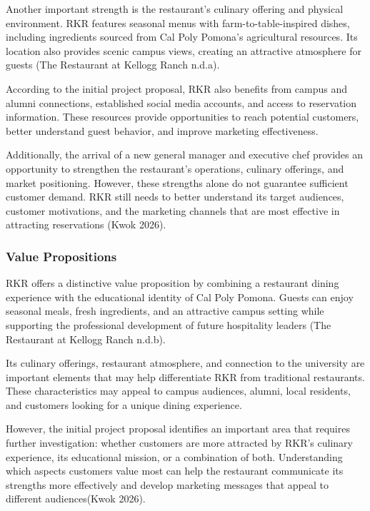 \documentclass[
  12pt,
  letterpaper,
  DIV=11,
  numbers=noendperiod]{scrartcl}
\begin{document}
Another important strength is the restaurant's culinary offering and
physical environment. RKR features seasonal menus with
farm-to-table-inspired dishes, including ingredients sourced from Cal
Poly Pomona's agricultural resources. Its location also provides scenic
campus views, creating an attractive atmosphere for guests (The
Restaurant at Kellogg Ranch n.d.a).

According to the initial project proposal, RKR also benefits from campus
and alumni connections, established social media accounts, and access to
reservation information. These resources provide opportunities to reach
potential customers, better understand guest behavior, and improve
marketing effectiveness.

Additionally, the arrival of a new general manager and executive chef
provides an opportunity to strengthen the restaurant's operations,
culinary offerings, and market positioning. However, these strengths
alone do not guarantee sufficient customer demand. RKR still needs to
better understand its target audiences, customer motivations, and the
marketing channels that are most effective in attracting reservations
(Kwok 2026).

\subsubsection{Value Propositions}\label{value-propositions}

RKR offers a distinctive value proposition by combining a restaurant
dining experience with the educational identity of Cal Poly Pomona.
Guests can enjoy seasonal meals, fresh ingredients, and an attractive
campus setting while supporting the professional development of future
hospitality leaders (The Restaurant at Kellogg Ranch n.d.b).

Its culinary offerings, restaurant atmosphere, and connection to the
university are important elements that may help differentiate RKR from
traditional restaurants. These characteristics may appeal to campus
audiences, alumni, local residents, and customers looking for a unique
dining experience.

However, the initial project proposal identifies an important area that
requires further investigation: whether customers are more attracted by
RKR's culinary experience, its educational mission, or a combination of
both. Understanding which aspects customers value most can help the
restaurant communicate its strengths more effectively and develop
marketing messages that appeal to different audiences(Kwok 2026).
\end{document}
